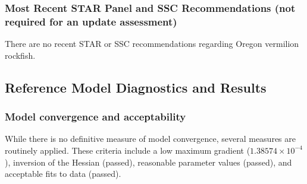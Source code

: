 \documentclass[11pt,
  english,
  a4paper,
]{article}
\begin{document}
\leavevmode\tagmcend\tagstructend\par


\hypertarget{most-recent-star-panel-and-ssc-recommendations-not-required-for-an-update-assessment}{%
\subsubsection{Most Recent STAR Panel and SSC Recommendations (not required for an update assessment)}\label{most-recent-star-panel-and-ssc-recommendations-not-required-for-an-update-assessment}}

\leavevmode\tagmcend\tagstructend


There are no recent STAR or SSC recommendations regarding Oregon vermilion rockfish.

\leavevmode\tagmcend\tagstructend\par


\hypertarget{reference-model-diagnostics-and-results}{%
\subsection{Reference Model Diagnostics and Results}\label{reference-model-diagnostics-and-results}}

\leavevmode\tagmcend\tagstructend


\hypertarget{model-convergence-and-acceptability}{%
\subsubsection{Model convergence and acceptability}\label{model-convergence-and-acceptability}}

\leavevmode\tagmcend\tagstructend


While there is no definitive measure of model convergence, several measures are routinely applied. These criteria include a low maximum gradient (\ensuremath{1.38574\times 10^{-4}}), inversion of the Hessian (passed), reasonable parameter values (passed), and acceptable fits to data (passed).

\leavevmode\tagmcend\tagstructend\par
\end{document}
